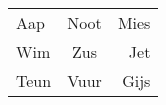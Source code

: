 \begin{tabular}{lcr}
  Aap  & Noot & Mies \\
  Wim  & Zus  & Jet  \\
  Teun & Vuur & Gijs \\
\end{tabular}

